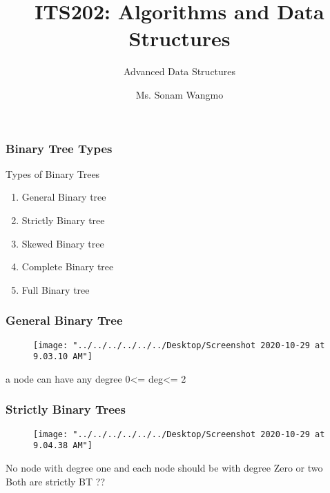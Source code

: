 \documentclass[11pt]{beamer}
\begin{document}
	\author{Ms. Sonam Wangmo}
	\title{ITS202: Algorithms and Data Structures}
	\subtitle{Advanced Data Structures}
	\institute{
		\textcolor{blue}{Gyalpozhing College of Information Technology \\ Royal University of Bhutan} \\
		\vspace{0.5cm}
	}
	\begin{frame}[plain]
		\maketitle
	\end{frame}
	\begin{frame}
		\frametitle{Binary Tree Types}
		\begin{block}{Types of Binary Trees}
				\begin{enumerate}
				\item General Binary tree
				\item Strictly Binary tree
				\item Skewed Binary tree
				\item Complete Binary tree
				\item Full Binary tree
			\end{enumerate}
		\end{block}
	
	\end{frame}

		\begin{frame}
		\frametitle{General Binary Tree}
	    \begin{figure}
	    	\centering
	    	\texttt{[image: "../../../../../../Desktop/Screenshot 2020-10-29 at 9.03.10 AM"]}
	    	\caption{}
	    	\label{fig:screenshot-2020-10-29-at-9}
	    \end{figure}
	    a node can have any degree 0<= deg<= 2
	\end{frame}

	\begin{frame}	
		\frametitle{Strictly Binary Trees}
	    \begin{figure}
	    	\centering
	    	\texttt{[image: "../../../../../../Desktop/Screenshot 2020-10-29 at 9.04.38 AM"]}
	    	\caption{}
	    	\label{fig:screenshot-2020-10-29-at-9}
	    \end{figure}
      No node with degree one and each node should be with degree Zero or two\\
      Both are strictly BT ??
	\end{frame}
\end{document}
